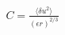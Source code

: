\documentclass[preview]{standalone}
\begin{document}
\begin{align*}
C = \frac{\langle \delta u^2 \rangle}{(\epsilon r)^{2/3}}
\end{align*}
\end{document}
